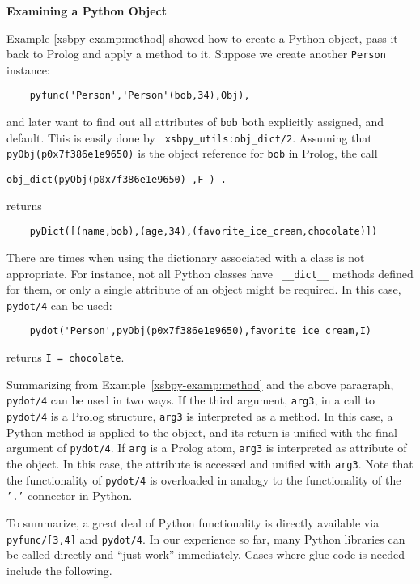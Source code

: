 \begin{example} \rm {\bf Examining a Python Object} \label{xsbpy-examp:exam-object}

\noindent
Example \ref{xsbpy-examp:method} showed how to create a Python object,
pass it back to Prolog and apply a method to it.  Suppose we create
another {\tt Person} instance:

\begin{verbatim}
    pyfunc('Person','Person'(bob,34),Obj),
\end{verbatim}
\noindent
and later want to find out all attributes of {\tt bob} both explicitly
assigned, and default.  This is easily done by {\tt
  xsbpy\_utils:obj\_dict/2}.  Assuming that {\tt
  pyObj(p0x7f386e1e9650)} is the object reference for {\tt bob} in
Prolog, the call
\begin{verbatim}
obj_dict(pyObj(p0x7f386e1e9650) ,F ) .
\end{verbatim}
returns
\begin{verbatim}
    pyDict([(name,bob),(age,34),(favorite_ice_cream,chocolate)])
\end{verbatim}

There are times when using the dictionary associated with a class is
not appropriate.  For instance, not all Python classes have {\tt
  \_\_dict\_\_} methods defined for them, or only a single attribute
of an object might be required.  In this case, {\tt pydot/4} can be
used:

\begin{verbatim}
    pydot('Person',pyObj(p0x7f386e1e9650),favorite_ice_cream,I)
\end{verbatim}
\noindent
returns {\tt I = chocolate}.

\noindent

Summarizing from Example~\ref{xsbpy-examp:method} and the above
paragraph, {\tt pydot/4} can be used in two ways.  If the third
argument, {\tt arg3}, in a call to {\tt pydot/4} is a Prolog
structure, {\tt arg3} is interpreted as a method.  In this case, a
Python method is applied to the object, and its return is unified with
the final argument of {\tt pydot/4}. If {\tt arg} is a Prolog atom,
{\tt arg3} is interpreted as attribute of the object.  In this case,
the attribute is accessed and unified with {\tt arg3}.  Note that the
functionality of {\tt pydot/4} is overloaded in analogy to the
functionality of the {\tt '.'} connector in Python.
\end{example}

To summarize, a great deal of Python functionality is directly
available via {\tt pyfunc/[3,4]} and {\tt pydot/4}.  In our
experience so far, many Python libraries can be called directly and
``just work'' immediately.  Cases where glue code is needed include
the following.

